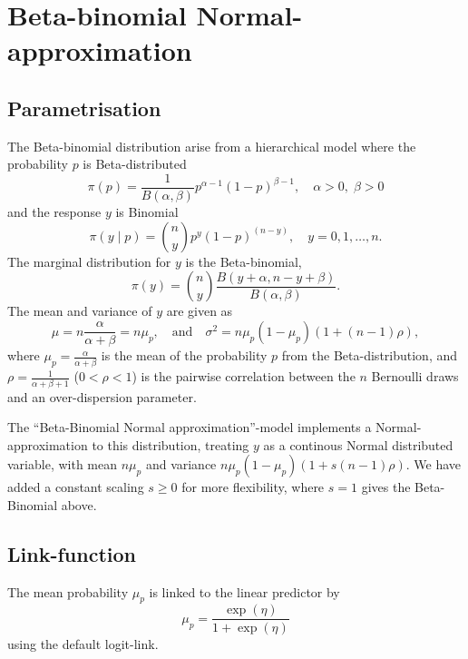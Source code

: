 \documentclass[a4paper,11pt]{article}
\begin{document}
\section*{Beta-binomial Normal-approximation}

\subsection*{Parametrisation}

The Beta-binomial distribution arise from a hierarchical model where
the probability $p$ is Beta-distributed
\begin{displaymath}
    \pi(p) = \frac{1}{B(\alpha, \beta)}
    p^{\alpha-1}(1-p)^{\beta-1},\quad \alpha > 0, \; \beta > 0
\end{displaymath}
and the response $y$ is Binomial
\begin{displaymath}
    \pi(y\mid p) = {n \choose y} p^y (1-p)^{(n-y)}, \quad y=0, 1,\ldots, n.
\end{displaymath}
The marginal distribution for $y$ is the Beta-binomial,
\begin{displaymath}
    \pi(y) = {n \choose y} \frac{
        B(y+\alpha, n-y + \beta)}{B(\alpha, \beta)}.
\end{displaymath}
The mean and variance of $y$ are given as
\begin{displaymath}
    \mu = n \frac{\alpha}{\alpha+\beta} = n \mu_{p}, \quad\text{and}\quad
    \sigma^{2} = n \mu_{p}(1-\mu_{p}) \left(1 + (n-1)\rho\right),
\end{displaymath}
where $\mu_{p} = \frac{\alpha}{\alpha+\beta}$ is the mean of the
probability $p$ from the Beta-distribution, and
$\rho = \frac{1}{\alpha+\beta+1}$ ($0 < \rho < 1$) is the pairwise
correlation between the $n$ Bernoulli draws and an over-dispersion
parameter.

The ``Beta-Binomial Normal approximation''-model implements a
Normal-approximation to this distribution, treating $y$ as a continous
Normal distributed variable, with mean $n\mu_p$ and variance
$n \mu_p (1-\mu_p)(1 + s(n-1)\rho)$. We have added a constant scaling
$s \ge 0$ for more flexibility, where $s=1$ gives the Beta-Binomial above.

\subsection*{Link-function}

The mean probability $\mu_{p}$ is linked to the linear predictor by
\begin{displaymath}
    \mu_p = \frac{\exp(\eta)}{1+\exp(\eta)}
\end{displaymath}
using the default logit-link.
\end{document}

